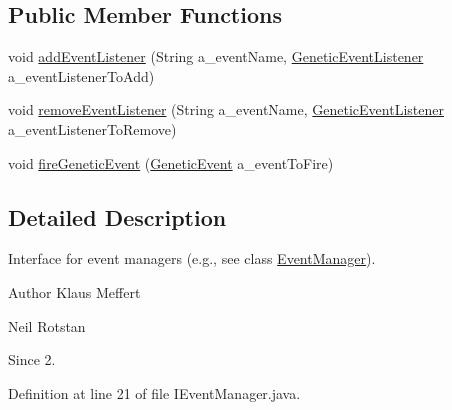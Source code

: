 \subsection*{Public Member Functions}
\begin{DoxyCompactItemize}
\item 
void \hyperlink{interfaceorg_1_1jgap_1_1event_1_1_i_event_manager_accdd33f5b80727b26a0d1c75df73904c}{add\-Event\-Listener} (String a\-\_\-event\-Name, \hyperlink{interfaceorg_1_1jgap_1_1event_1_1_genetic_event_listener}{Genetic\-Event\-Listener} a\-\_\-event\-Listener\-To\-Add)
\item 
void \hyperlink{interfaceorg_1_1jgap_1_1event_1_1_i_event_manager_a851c20e5ad81c1a000fe4ac8087077f1}{remove\-Event\-Listener} (String a\-\_\-event\-Name, \hyperlink{interfaceorg_1_1jgap_1_1event_1_1_genetic_event_listener}{Genetic\-Event\-Listener} a\-\_\-event\-Listener\-To\-Remove)
\item 
void \hyperlink{interfaceorg_1_1jgap_1_1event_1_1_i_event_manager_addb26702fd3c1285e43d0774a023b017}{fire\-Genetic\-Event} (\hyperlink{classorg_1_1jgap_1_1event_1_1_genetic_event}{Genetic\-Event} a\-\_\-event\-To\-Fire)
\end{DoxyCompactItemize}


\subsection{Detailed Description}
Interface for event managers (e.\-g., see class \hyperlink{classorg_1_1jgap_1_1event_1_1_event_manager}{Event\-Manager}).

\begin{DoxyAuthor}{Author}
Klaus Meffert 

Neil Rotstan 
\end{DoxyAuthor}
\begin{DoxySince}{Since}
2. 
\end{DoxySince}


Definition at line 21 of file I\-Event\-Manager.\-java.



